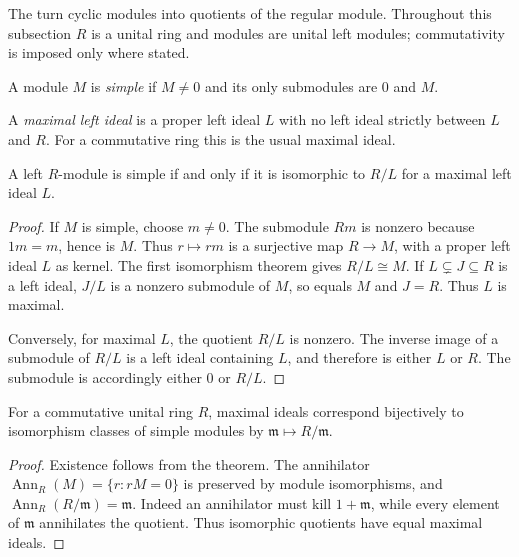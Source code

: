 The  turn cyclic modules into quotients of the regular module. Throughout this subsection $R$ is a unital ring and modules are unital left modules; commutativity is imposed only where stated.

\begin{definition}\label{def-simple-module}
A module $M$ is \emph{simple} if $M\ne0$ and its only submodules are $0$ and $M$.
\end{definition}

\begin{definition}\label{def-maximal-left-ideal}
A \emph{maximal left ideal} is a proper left ideal $L$ with no left ideal strictly between $L$ and $R$. For a commutative ring this is the usual maximal ideal.
\end{definition}

\begin{theorem}\label{thm-simple-module-quotient}
A left $R$-module is simple if and only if it is isomorphic to $R/L$ for a maximal left ideal $L$.
\end{theorem}
\begin{proof}\label{proof-simple-module-quotient}
If $M$ is simple, choose $m\ne0$. The submodule $Rm$ is nonzero because $1m=m$, hence is $M$. Thus $r\mapsto rm$ is a surjective map $R\to M$, with a proper left ideal $L$ as kernel. The first isomorphism theorem gives $R/L\cong M$. If $L\subsetneq J\subseteq R$ is a left ideal, $J/L$ is a nonzero submodule of $M$, so equals $M$ and $J=R$. Thus $L$ is maximal.

Conversely, for maximal $L$, the quotient $R/L$ is nonzero. The inverse image of a submodule of $R/L$ is a left ideal containing $L$, and therefore is either $L$ or $R$. The submodule is accordingly either $0$ or $R/L$.
\end{proof}

\begin{corollary}\label{cor-commutative-simple-classification}
For a commutative unital ring $R$, maximal ideals correspond bijectively to isomorphism classes of simple modules by $\mathfrak m\mapsto R/\mathfrak m$.
\end{corollary}
\begin{proof}\label{proof-commutative-simple-classification}
Existence follows from the theorem. The annihilator $\operatorname{Ann}_R(M)=\{r:rM=0\}$ is preserved by module isomorphisms, and $\operatorname{Ann}_R(R/\mathfrak m)=\mathfrak m$. Indeed an annihilator must kill $1+\mathfrak m$, while every element of $\mathfrak m$ annihilates the quotient. Thus isomorphic quotients have equal maximal ideals.
\end{proof}

